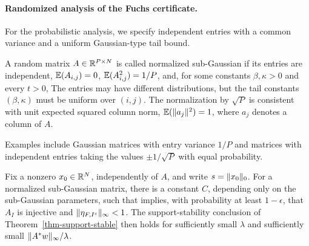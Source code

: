 \paragraph{Randomized analysis of the Fuchs certificate.}

For the probabilistic analysis, we specify independent entries with a common variance and a uniform Gaussian-type tail bound.

\begin{defn}
A random matrix $A\in\mathbb{R}^{P\times N}$ is called normalized sub-Gaussian if its entries are independent, $\mathbb{E}(A_{i,j})=0$, $\mathbb{E}(A_{i,j}^2)=1/P$, and, for some constants $\beta,\kappa>0$ and every $t>0$,
The entries may have different distributions, but the tail constants $(\beta,\kappa)$ must be uniform over $(i,j)$.
%
The normalization by $\sqrt{P}$ is consistent with unit expected squared column norm, $\mathbb{E}(\lVert a_j\rVert^2)=1$, where $a_j$ denotes a column of $A$.
\end{defn}

Examples include Gaussian matrices with entry variance $1/P$ and matrices with independent entries taking the values $\pm1/\sqrt P$ with equal probability.


\begin{thm}\label{thm-cs-etaf}
Fix a nonzero $x_0\in\mathbb{R}^N$, independently of $A$, and write $s=\lVert x_0\rVert_0$. For a normalized sub-Gaussian matrix, there is a constant $C$, depending only on the sub-Gaussian parameters, such that
implies, with probability at least $1-\epsilon$, that $A_I$ is injective and $\lVert\eta_{F,I^c}\rVert_\infty<1$. The support-stability conclusion of Theorem~\ref{thm-support-stable} then holds for sufficiently small $\lambda$ and sufficiently small $\lVert A^*w\rVert_\infty/\lambda$.
\end{thm}

